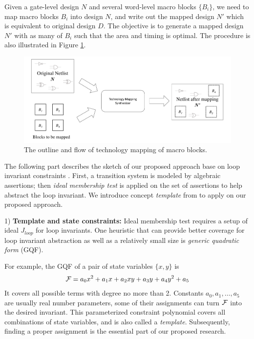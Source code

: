 \begin{Problem}
Given a gate-level design $N$ and several word-level macro blocks $\{B_i\}$, we need to map macro
blocks $B_i$ into design $N$, and write out the mapped design $N'$ which is equivalent to original
design $D$. The objective is to generate a mapped design $N'$ with as many of $B_i$ such that the area
and timing is optimal. The procedure is also illustrated in Figure \ref{fig:macro}.

\begin{figure}[bp]
	\begin{center}
	\includegraphics[width=\textwidth]{newfig/macro.pdf}
	\end{center}
	\caption{The outline and flow of technology mapping of macro blocks.}
	\label{fig:macro}
\end{figure}

\end{Problem}

The following part describes the sketch of our proposed approach base on loop invariant constraints \cite{sankaranarayanan2004non}.
First, a transition system is modeled by algebraic assertions; then \emph{ideal membership test} \cite{lv:phd}
is applied on the set of assertions to help abstract the loop invariant. We introduce concept \emph{template}
from \cite{sankaranarayanan2004non} to apply on our proposed approach.

1) {\bf Template and state constraints:}  Ideal membership test requires a setup of ideal $J_{loop}$
for loop invariants. 
One heuristic that can provide better coverage for loop invariant abstraction as well as a
relatively small size is \emph{generic quadratic form} (GQF).

For example, the GQF of a pair of state variables $\{x,y\}$ is
$${\mathcal{F}} = a_0x^2+a_1x+a_2xy+a_3y+a_4y^2+a_5$$
It covers all possible terms with degree no more than 2. Constants $a_0,a_1,\dots, a_5$ are 
usually real number parameters,
some of their assignments can turn ${\mathcal{F}}$ into the desired invariant. This parameterized constraint
polynomial covers all combinations of state variables, and is also called a \emph{template}.
Subsequently, finding a proper assignment is the essential part of our proposed research.

